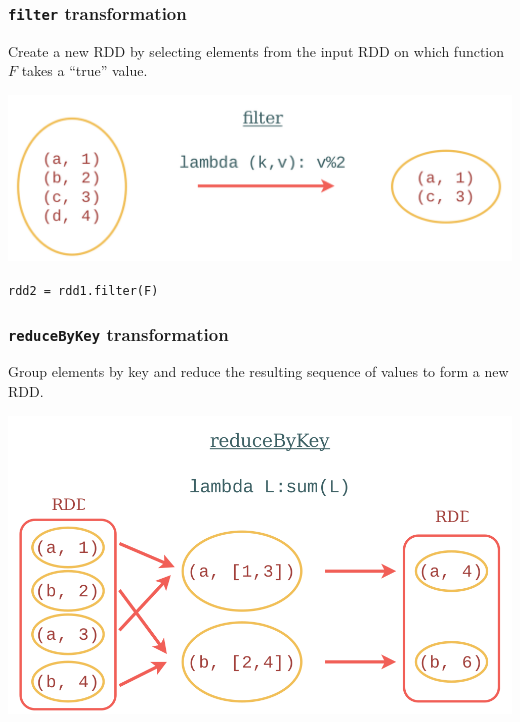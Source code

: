 \documentclass[english,serif,mathserif]{beamer}
\begin{document}
\begin{frame}
  \frametitle{\texttt{filter} transformation}

  \begin{center}
    Create a new RDD by selecting elements from the input RDD on which
    function~$F$ takes a ``true'' value.

    \+
    \includegraphics{fig/filter-example.png}

    \+
    \texttt{rdd2 = rdd1.filter(F)}
\end{center}
\end{frame}


\begin{frame}
  \frametitle{\texttt{reduceByKey} transformation}

  \begin{center}
    Group elements by key and reduce the resulting sequence of values to form a
    new RDD.

    \+
    \includegraphics{fig/reduceByKey-example.png}
  \end{center}
\end{frame}
\end{document}

